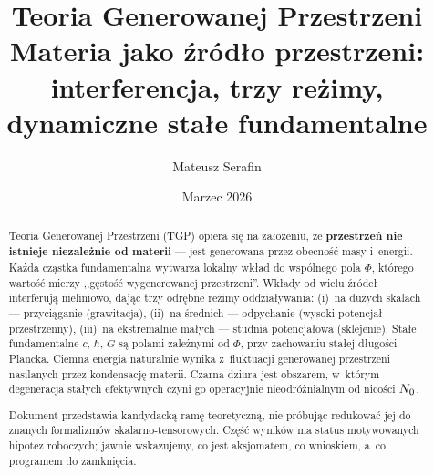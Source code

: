 \documentclass[11pt,a4paper]{article}
\begin{document}
\title{Teoria Generowanej Przestrzeni\\[6pt]
\large Materia jako \'zr\'od\l{}o przestrzeni: interferencja, trzy re\.zimy,\\
dynamiczne sta\l{}e fundamentalne}
\author{Mateusz Serafin}
\date{Marzec 2026}
\maketitle

\begin{abstract}
Teoria Generowanej Przestrzeni (TGP) opiera si\k{e} na za\l{}o\.zeniu, \.ze
\textbf{przestrze\'n nie istnieje niezale\.znie od materii} ---
jest generowana przez obecno\'s\'c masy i~energii. Ka\.zda cz\k{a}stka
fundamentalna wytwarza lokalny wk\l{}ad do wsp\'olnego pola $\Phi$,
kt\'orego warto\'s\'c mierzy ,,g\k{e}sto\'s\'c wygenerowanej przestrzeni''.
Wk\l{}ady od wielu \'zr\'ode\l{} interferuj\k{a} nieliniowo, daj\k{a}c trzy
odr\k{e}bne re\.zimy oddzia\l{}ywania: (i)~na du\.zych skalach ---
przyci\k{a}ganie (grawitacja), (ii)~na \'srednich --- odpychanie
(wysoki potencja\l{} przestrzenny), (iii)~na ekstremalnie ma\l{}ych ---
studnia potencja\l{}owa (sklejenie). Sta\l{}e fundamentalne $c$, $\hbar$, $G$
s\k{a} polami zale\.znymi od $\Phi$, przy zachowaniu sta\l{}ej d\l{}ugo\'sci Plancka.
Ciemna energia naturalnie wynika z~fluktuacji generowanej przestrzeni
nasilanych przez kondensacj\k{e} materii. Czarna dziura jest
obszarem, w~kt\'orym degeneracja sta\l{}ych efektywnych
czyni go operacyjnie nieodr\'o\.znialnym od nico\'sci $N_0$.

Dokument przedstawia kandydack\k{a} ram\k{e} teoretyczn\k{a},
nie pr\'obuj\k{a}c redukowa\'c jej do znanych formalizm\'ow
skalarno-tensorowych. Cz\k{e}\'s\'c wynik\'ow ma status
motywowanych hipotez roboczych; jawnie wskazujemy, co jest
aksjomatem, co wnioskiem, a~co programem do zamkni\k{e}cia.
\end{abstract}

\tableofcontents
\newpage


\end{document}
